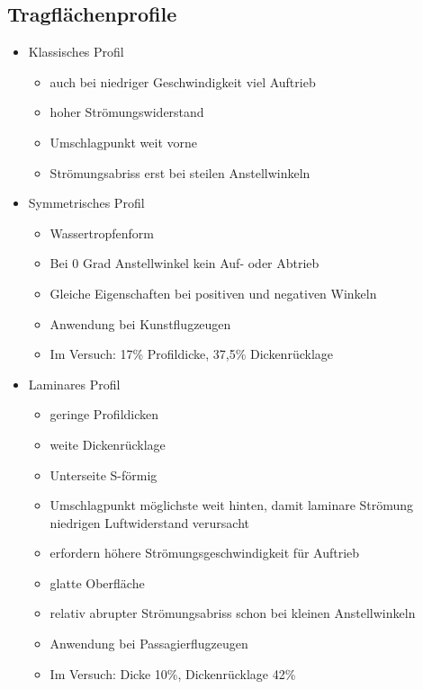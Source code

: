 \documentclass[a4paper,10pt]{scrartcl}
\begin{document}
		\subsection{Tragflächenprofile}
			\begin{itemize}
				\item Klassisches Profil
				\begin{itemize}
					\item auch bei niedriger Geschwindigkeit viel Auftrieb
					\item hoher Strömungswiderstand
					\item Umschlagpunkt weit vorne
					\item Strömungsabriss erst bei steilen Anstellwinkeln
				\end{itemize}
				\item Symmetrisches Profil
				\begin{itemize}
					\item Wassertropfenform
					\item Bei 0 Grad Anstellwinkel kein Auf- oder Abtrieb
					\item Gleiche Eigenschaften bei positiven und negativen Winkeln
					\item Anwendung bei Kunstflugzeugen
					\item Im Versuch: 17\% Profildicke, 37,5\% Dickenrücklage
				\end{itemize}
				\item Laminares Profil
				\begin{itemize}
					\item geringe Profildicken
					\item weite Dickenrücklage
					\item Unterseite S-förmig
					\item Umschlagpunkt möglichste weit hinten, damit laminare Strömung niedrigen Luftwiderstand verursacht
					\item erfordern höhere Strömungsgeschwindigkeit für Auftrieb 
					\item glatte Oberfläche
					\item relativ abrupter Strömungsabriss schon bei kleinen Anstellwinkeln
					\item Anwendung bei Passagierflugzeugen
					\item Im Versuch: Dicke 10\%, Dickenrücklage 42\%
				\end{itemize}
			\end{itemize}
		
\end{document}
